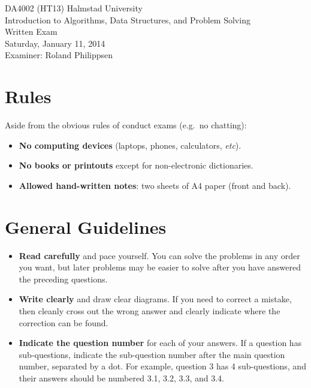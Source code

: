 \documentclass[a4paper]{article}
\newcounter{question}
\begin{document}
\pagestyle{empty}
\thispagestyle{empty}



\noindent
\begin{minipage}{\columnwidth}
  \centering
  \Large
  DA4002 (HT13) Halmstad University\\
  Introduction to Algorithms, Data Structures, and Problem Solving\\[3\baselineskip]
  \Huge
  Written Exam\\
  \Large
  Saturday, January 11, 2014\\[2\baselineskip]
  Examiner: Roland Philippsen
\end{minipage}

\vfill

\noindent
\begin{center}
\end{center}

\vfill



\section*{Rules}

Aside from the obvious rules of conduct exams (e.g.\ no chatting):

\begin{itemize}
\item
  \textbf{No computing devices} (laptops, phones, calculators, \emph{etc}).
\item
  \textbf{No books or printouts} except for non-electronic dictionaries.
\item
  \textbf{Allowed hand-written notes}: two sheets of A4 paper (front and back).
\end{itemize}



\section*{General Guidelines}

\begin{itemize}
\item
  \textbf{Read carefully} and pace yourself.
  You can solve the problems in any order you want, but later problems may be easier to solve after you have answered the preceding questions.
\item
  \textbf{Write clearly} and draw clear diagrams.
  If you need to correct a mistake, then cleanly cross out the wrong answer and clearly indicate where the correction can be found.
\item
  \textbf{Indicate the question number} for each of your answers.
  If a question has sub-questions, indicate the sub-question number after the main question number, separated by a dot.
  For example, question 3 has 4 sub-questions, and their answers should be numbered 3.1, 3.2, 3.3, and 3.4.
\end{itemize}
\end{document}
